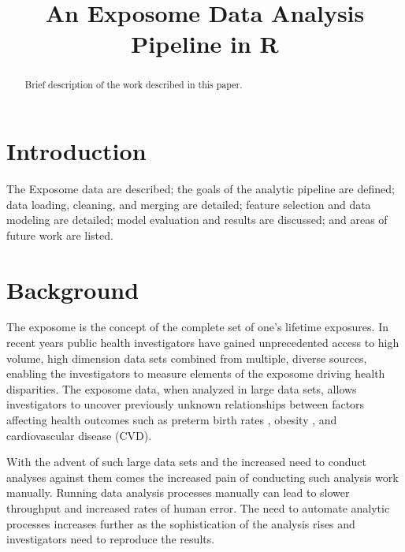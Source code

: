 \documentclass[conference,compsoc]{IEEEtran}
\begin{document}
\title{An Exposome Data Analysis Pipeline in R}

\author{
}

\maketitle

\begin{abstract}
Brief description of the work described in this paper.
\end{abstract}

\section{Introduction}

The Exposome data are described; the goals of the analytic pipeline are defined; data loading,
cleaning, and merging are detailed; feature selection and data modeling are detailed; model evaluation and results are discussed;
and areas of future work are listed.

\section{Background}

The exposome is the concept of the complete set of one's lifetime exposures. \cite{juarez} In recent years public health investigators have gained 
unprecedented access to high volume, high dimension data sets combined from multiple, diverse sources,
enabling the investigators to measure elements of the exposome driving health disparities. The exposome data,
when analyzed in large data sets, allows investigators to uncover previously unknown relationships between factors affecting 
health outcomes such as preterm birth rates \cite{kershenbaum},
obesity \cite{raman}, and cardiovascular disease (CVD).

With the advent of such large data sets and the increased need to conduct analyses against them comes the increased pain of conducting such analysis work manually.
Running data analysis processes manually can lead to slower throughput and increased rates of human error. The need to automate analytic processes increases further
as the sophistication of the analysis rises and investigators need to reproduce the results.
\end{document}

